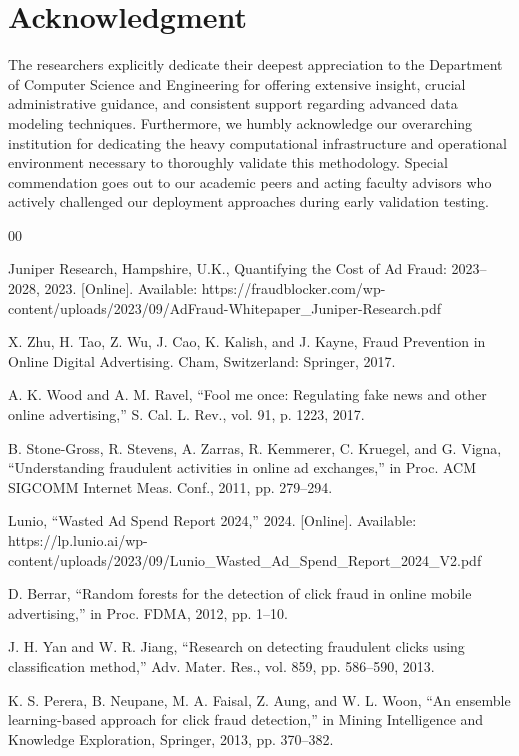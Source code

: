 \documentclass[conference]{IEEEtran}
\begin{document}
\section*{Acknowledgment}
The researchers explicitly dedicate their deepest appreciation to the Department of Computer Science and Engineering for offering extensive insight, crucial administrative guidance, and consistent support regarding advanced data modeling techniques. Furthermore, we humbly acknowledge our overarching institution for dedicating the heavy computational infrastructure and operational environment necessary to thoroughly validate this methodology. Special commendation goes out to our academic peers and acting faculty advisors who actively challenged our deployment approaches during early validation testing.

\begin{thebibliography}{00}

 Juniper Research, Hampshire, U.K., Quantifying the Cost of Ad Fraud: 2023--2028, 2023. [Online]. Available: https://fraudblocker.com/wp-content/uploads/2023/09/AdFraud-Whitepaper\_Juniper-Research.pdf 

 X. Zhu, H. Tao, Z. Wu, J. Cao, K. Kalish, and J. Kayne, Fraud Prevention in Online Digital Advertising. Cham, Switzerland: Springer, 2017.

 A. K. Wood and A. M. Ravel, ``Fool me once: Regulating fake news and other online advertising,'' S. Cal. L. Rev., vol. 91, p. 1223, 2017.

 B. Stone-Gross, R. Stevens, A. Zarras, R. Kemmerer, C. Kruegel, and G. Vigna, ``Understanding fraudulent activities in online ad exchanges,'' in Proc. ACM SIGCOMM Internet Meas. Conf., 2011, pp. 279--294.

 Lunio, ``Wasted Ad Spend Report 2024,'' 2024. [Online]. Available: https://lp.lunio.ai/wp-content/uploads/2023/09/Lunio\_Wasted\_Ad\_Spend\_Report\_2024\_V2.pdf

 D. Berrar, ``Random forests for the detection of click fraud in online mobile advertising,'' in Proc. FDMA, 2012, pp. 1--10.

 J. H. Yan and W. R. Jiang, ``Research on detecting fraudulent clicks using classification method,'' Adv. Mater. Res., vol. 859, pp. 586--590, 2013.

 K. S. Perera, B. Neupane, M. A. Faisal, Z. Aung, and W. L. Woon, ``An ensemble learning-based approach for click fraud detection,'' in Mining Intelligence and Knowledge Exploration, Springer, 2013, pp. 370--382.


\end{thebibliography}
\end{document}
